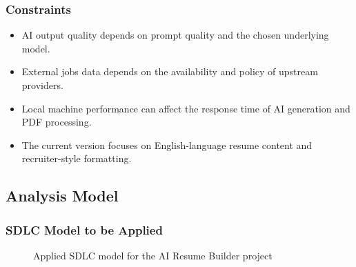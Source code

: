 \subsubsection{Constraints}
\begin{itemize}
\item AI output quality depends on prompt quality and the chosen underlying model.
\item External jobs data depends on the availability and policy of upstream providers.
\item Local machine performance can affect the response time of AI generation and PDF processing.
\item The current version focuses on English-language resume content and recruiter-style formatting.
\end{itemize}

\subsection{Analysis Model}
\subsubsection{SDLC Model to be Applied}
\begin{figure}[H]
\centering
{}
\caption{Applied SDLC model for the AI Resume Builder project}
\end{figure}

